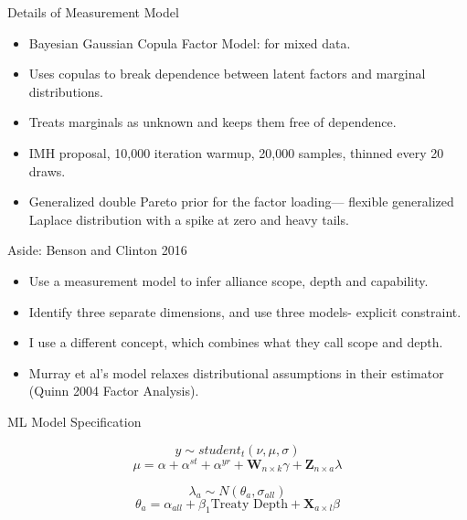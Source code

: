\documentclass[12pt]{beamer}
\begin{document}

\begin{frame}{Details of Measurement Model}

\begin{itemize}
\item Bayesian Gaussian Copula Factor Model: for mixed data. 
\item Uses copulas to break dependence between latent factors and marginal distributions. 
\item Treats marginals as unknown and keeps them free of dependence. 
\item IMH proposal, 10,000 iteration warmup, 20,000 samples, thinned every 20 draws. 
\item Generalized double Pareto prior for the factor loading--- flexible generalized Laplace distribution with a spike at zero and heavy tails. 
\end{itemize} 


\end{frame}




\begin{frame}{Aside: Benson and Clinton 2016}

\begin{itemize}
\item Use a measurement model to infer alliance scope, depth and capability. 
\item Identify three separate dimensions, and use three models- explicit constraint. 
\item I use a different concept, which combines what they call scope and depth. 
\item Murray et al's model relaxes distributional assumptions in their estimator (Quinn 2004 Factor Analysis). 
\end{itemize}


\end{frame}



\begin{frame}{ML Model Specification}

\begin{equation}
y \sim student_t(\nu, \mu, \sigma)
\end{equation}
\begin{equation}
\mu = \alpha + \alpha^{st} + \alpha^{yr} +\textbf{W}_{n \times k} \gamma + \textbf{Z}_{n \times a} \lambda
\end{equation}

\begin{equation}
\lambda_{a} \sim N(\theta_{a}, \sigma_{all})
\end{equation}
\begin{equation}
\theta_a = \alpha_{all} + \beta_1 \mbox{Treaty Depth} + \textbf{X}_{a \times l} \beta
\end{equation}


\end{frame}
\end{document}

